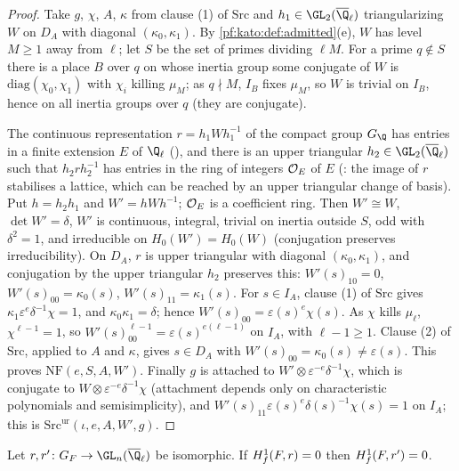 \begin{proof}
Take $g$, $\chi$, $A$, $\kappa$ from clause (1) of $\mathrm{Src}$ and $h_1\in\GL_2(\katoQlb)$ triangularizing $W$ on $D_A$
with diagonal $(\kappa_0,\kappa_1)$. By \cref{pf:kato:def:admitted}(e), $W$ has level $M\ge1$ away from $\ell$; let $S$ be
the set of primes dividing $\ell M$. For a prime $q\notin S$ there is a place $B$ over $q$ on whose inertia group
some conjugate of $W$ is $\mathrm{diag}(\chi_0,\chi_1)$ with $\chi_i$ killing $\mu_M$; as $q\nmid M$, $I_B$ fixes $\mu_M$, so
$W$ is trivial on $I_B$, hence on all inertia groups over $q$ (they are conjugate).

The continuous representation $r=h_1Wh_1^{-1}$ of the compact group $G_\Q$ has entries in a finite extension $E$ of
$\Q_\ell$ (), and there is an upper
triangular $h_2\in\GL_2(\katoQlb)$ such that $h_2rh_2^{-1}$ has entries in the ring of integers $\mathcal{O}_E$ of $E$
(: the image of $r$ stabilises a lattice, which
can be reached by an upper triangular change of basis). Put $h=h_2h_1$ and $W'=hWh^{-1}$; $\mathcal{O}_E$ is a coefficient
ring. Then $W'\cong W$, $\det W'=\delta$, $W'$ is continuous, integral, trivial on inertia outside $S$, odd with
$\delta^2=1$, and irreducible on $H_0(W')=H_0(W)$ (conjugation preserves irreducibility). On $D_A$,
$r$ is upper triangular with diagonal $(\kappa_0,\kappa_1)$, and conjugation by the upper triangular $h_2$ preserves this:
$W'(s)_{10}=0$, $W'(s)_{00}=\kappa_0(s)$, $W'(s)_{11}=\kappa_1(s)$. For $s\in I_A$, clause (1) of $\mathrm{Src}$ gives
$\kappa_1\varepsilon^e\delta^{-1}\chi=1$, and $\kappa_0\kappa_1=\delta$; hence $W'(s)_{00}=\varepsilon(s)^e\chi(s)$. As $\chi$ kills $\mu_\ell$,
$\chi^{\ell-1}=1$, so $W'(s)_{00}^{\ell-1}=\varepsilon(s)^{e(\ell-1)}$ on $I_A$, with $\ell-1\ge1$. Clause (2) of $\mathrm{Src}$,
applied to $A$ and $\kappa$, gives $s\in D_A$ with $W'(s)_{00}=\kappa_0(s)\ne\varepsilon(s)$. This proves $\mathrm{NF}(e,S,A,W')$.
Finally $g$ is attached to $W'\otimes\varepsilon^{-e}\delta^{-1}\chi$, which is conjugate to $W\otimes\varepsilon^{-e}\delta^{-1}\chi$
(attachment depends only on characteristic polynomials and semisimplicity), and
$W'(s)_{11}\varepsilon(s)^e\delta(s)^{-1}\chi(s)=1$ on $I_A$; this is $\mathrm{Src}^{\mathrm{ur}}(\iota,e,A,W',g)$.
\end{proof}

\begin{lemma}\label{pf:kato:conj}
Let $r,r'\colon G_F\to\GL_n(\katoQlb)$ be isomorphic. If $H^1_{f}(F,r)=0$ then $H^1_{f}(F,r')=0$.
\end{lemma}

